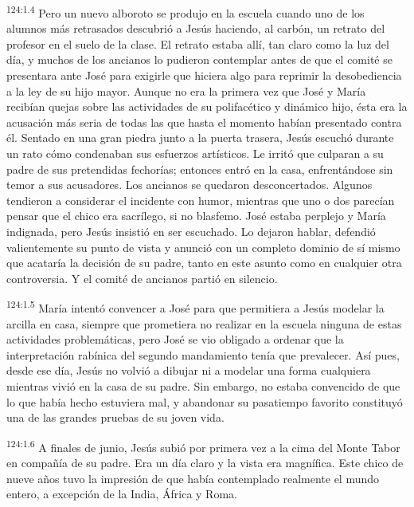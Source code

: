 \par 
\textsuperscript{124:1.4} Pero un nuevo alboroto se produjo en la escuela cuando uno de los alumnos más retrasados descubrió a Jesús haciendo, al carbón, un retrato del profesor en el suelo de la clase. El retrato estaba allí, tan claro como la luz del día, y muchos de los ancianos lo pudieron contemplar antes de que el comité se presentara ante José para exigirle que hiciera algo para reprimir la desobediencia a la ley de su hijo mayor. Aunque no era la primera vez que José y María recibían quejas sobre las actividades de su polifacético y dinámico hijo, ésta era la acusación más seria de todas las que hasta el momento habían presentado contra él. Sentado en una gran piedra junto a la puerta trasera, Jesús escuchó durante un rato cómo condenaban sus esfuerzos artísticos. Le irritó que culparan a su padre de sus pretendidas fechorías; entonces entró en la casa, enfrentándose sin temor a sus acusadores. Los ancianos se quedaron desconcertados. Algunos tendieron a considerar el incidente con humor, mientras que uno o dos parecían pensar que el chico era sacrílego, si no blasfemo. José estaba perplejo y María indignada, pero Jesús insistió en ser escuchado. Lo dejaron hablar, defendió valientemente su punto de vista y anunció con un completo dominio de sí mismo que acataría la decisión de su padre, tanto en este asunto como en cualquier otra controversia. Y el comité de ancianos partió en silencio.

\par 
\textsuperscript{124:1.5} María intentó convencer a José para que permitiera a Jesús modelar la arcilla en casa, siempre que prometiera no realizar en la escuela ninguna de estas actividades problemáticas, pero José se vio obligado a ordenar que la interpretación rabínica del segundo mandamiento tenía que prevalecer. Así pues, desde ese día, Jesús no volvió a dibujar ni a modelar una forma cualquiera mientras vivió en la casa de su padre. Sin embargo, no estaba convencido de que lo que había hecho estuviera mal, y abandonar su pasatiempo favorito constituyó una de las grandes pruebas de su joven vida.

\par 
\textsuperscript{124:1.6} A finales de junio, Jesús subió por primera vez a la cima del Monte Tabor en compañía de su padre. Era un día claro y la vista era magnífica. Este chico de nueve años tuvo la impresión de que había contemplado realmente el mundo entero, a excepción de la India, África y Roma.

